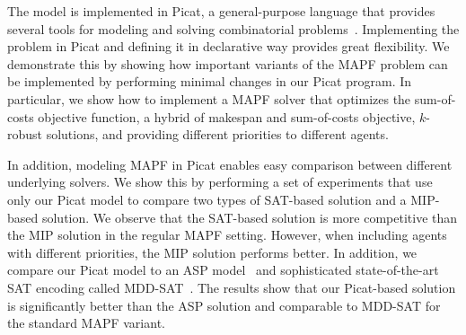 \documentclass[conference]{IEEEtran}
\begin{document}
The model is implemented in Picat, a general-purpose language that provides several tools for modeling and solving combinatorial problems~\cite{PicatBook15}. 
Implementing the problem in Picat and defining it in declarative way provides great flexibility. We demonstrate this by showing how important variants of the MAPF problem can be implemented by performing minimal changes in our Picat program. 
In particular, we show how to implement a MAPF solver that optimizes the sum-of-costs objective function, a hybrid of makespan and sum-of-costs objective, $k$-robust solutions, and providing different priorities to different agents. 

In addition, modeling MAPF in Picat enables easy comparison between different underlying solvers. 
We show this by performing a set of experiments that use only our Picat model to compare two types of SAT-based solution and a MIP-based solution. 
We observe that the SAT-based solution is more competitive than the MIP solution in the regular MAPF setting. However, when including agents with different priorities, the MIP solution performs better. 
In addition, we compare our Picat model to an ASP model~\cite{ErdemKOS13} and sophisticated state-of-the-art SAT encoding called MDD-SAT~\cite{SurynekFSB16}. The results show that
our Picat-based solution is significantly better than the ASP solution and comparable to MDD-SAT for the standard MAPF variant. %

\end{document}
